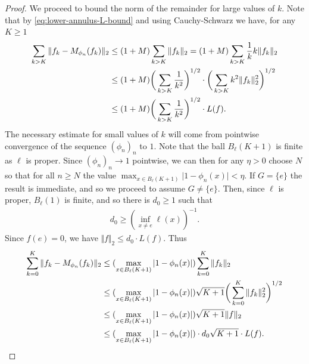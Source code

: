 \documentclass[12pt,a4paper,oneside,final,reqno]{amsart}
\theoremstyle{plain}
\theoremstyle{definition}
\begin{document}
\begin{proof}
   We proceed to bound the norm of the remainder for large values of $k$.
   Note that by \eqref{eq:lower-annulus-L-bound} and using Cauchy-Schwarz we have, for any $K \geq 1$
   \begin{align*}
       \sum_{k > K} \Vert f_k-M_{\phi_n}(f_k) \Vert_2 &\leq (1+M) \sum_{k > K } \Vert f_k \Vert_2 = (1+M) \sum_{k > K} \frac{1}{k} k\Vert f_k \Vert_2 \notag\\
       &\leq (1+M) \bigg( \sum_{k > K} \frac{1}{k^2} \bigg)^{1/2} \cdot \bigg( \sum_{k > K} k^2 \Vert f_k \Vert_2^2 \bigg)^{1/2}\notag  \\
       &\leq (1+M) \bigg( \sum_{k>K} \frac{1}{k^2} \bigg)^{1/2} \cdot L(f).
   \end{align*}
    The necessary estimate for small values of $k$ will come from pointwise convergence of the sequence $(\phi_n)_n$ to $1$. Note that the ball $B_\ell(K+1)$ is finite as $\ell$ is proper. Since $(\phi_n)_n \to 1$ pointwise, we can then for any $\eta >0$ choose $N$ so that for all $n \geq N$ 
    the value $\max_{x\in B_\ell(K+1)}\vert 1 -\phi_n(x) \vert < \eta$. 
    If $G = \{e\}$ the result is immediate, and so we proceed to assume $G \neq \{e\}$. 
    Then, since $\ell$ is proper, $B_\ell(1)$ is finite, and so there is $d_0 \geq 1$ such that
    \begin{align*}
        d_0 \geq (\inf_{x\neq e} \ell(x))^{-1}.
    \end{align*}
   Since $f(e) = 0$, we have $\Vert f \Vert_2 \leq d_0 \cdot L(f)$. Thus
   \begin{align*}
       \sum_{k=0}^K \Vert f_k - M_{\phi_n}(f_k) \Vert_2 &\leq (\max_{x \in B_\ell(K+1)}\vert 1-\phi_n(x) \vert) \sum_{k=0}^K \Vert f_k \Vert_2 \notag \\
       &\leq  (\max_{x \in B_\ell(K+1)}\vert 1-\phi_n(x) \vert) \sqrt{K+1} \bigg( \sum_{k=0}^K \Vert f_k \Vert_2^2 \bigg)^{1/2}      \notag    \\
       &\leq  (\max_{x \in B_\ell(K+1)}\vert 1-\phi_n(x) \vert) \sqrt{K+1} \Vert f \Vert_2 \notag \\
       &\leq  (\max_{x \in B_\ell(K+1)}\vert 1-\phi_n(x) \vert) \cdot d_0 \sqrt{K+1}\cdot L(f) .
   \end{align*}


\end{proof}
\end{document}
